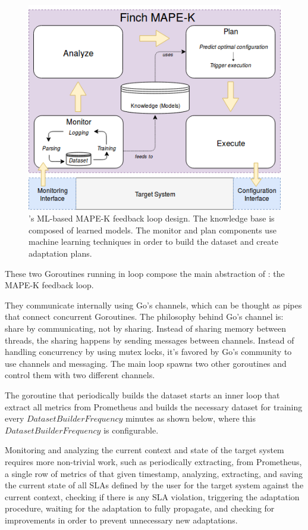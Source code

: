 \begin{figure}[h]
  \includegraphics[scale=0.5]{images/FinchMAPE.png}
  \caption{\projectname{}'s ML-based MAPE-K feedback loop design. The knowledge base is composed of learned models. The monitor and plan components use machine learning techniques in order to build the dataset and create adaptation plans.}
  \label{fig:finchMape}
\end{figure}

These two Goroutines running in loop compose the main abstraction of \projectname{}: the MAPE-K feedback loop.

They communicate internally using Go's channels, which can be thought as pipes that connect concurrent Goroutines. The philosophy behind Go's channel is: share by communicating, not by sharing. Instead of sharing memory between threads, the sharing happens by sending messages between channels.
Instead of handling concurrency by using mutex locks, it's favored by Go's community to use channels and messaging. The main loop spawns two other goroutines and control them with two different channels.

The goroutine that periodically builds the dataset starts an inner loop that extract all metrics from Prometheus and builds the necessary dataset for training every $DatasetBuilderFrequency$ minutes as shown below, where this $DatasetBuilderFrequency$ is configurable.

Monitoring and analyzing the current context and state of the target system requires more non-trivial work, such as periodically extracting, from Prometheus, a single row of metrics of that given timestamp, analyzing, extracting, and saving the current state of all SLAs defined by the user for the target system against the current context, checking if there is any SLA violation, triggering the adaptation procedure, waiting for the adaptation to fully propagate, and checking for improvements in order to prevent unnecessary new adaptations.

